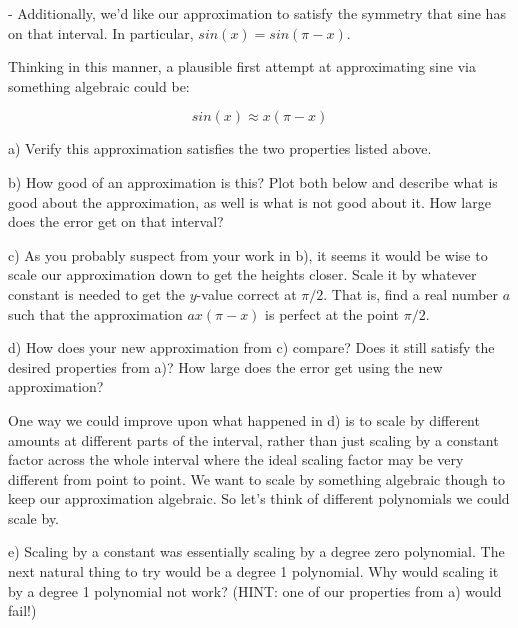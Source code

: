 - Additionally, we'd like our approximation to satisfy the symmetry that sine has on that interval.  In particular, $sin(x)= sin(\pi-x)$.

\vspace{.1in}

Thinking in this manner, a plausible first attempt at approximating sine via something algebraic could be:

$$ sin(x) \approx x(\pi-x)$$

a) Verify this approximation satisfies the two properties listed above.

\vspace{2in}

b) How good of an approximation is this?  Plot both below and describe what is good about the approximation, as well is what is not good about it.   How large does the error get on that interval?

\pagebreak

c) As you probably suspect from your work in b), it seems it would  be wise to scale our approximation down to get the heights closer.  Scale it by whatever constant is needed to get the $y$-value correct at $\pi/2$.  That is, find a real number $a$ such that the approximation $ax(\pi-x)$ is perfect at the point $\pi/2$.

\vspace{2in}

d) How does your new approximation from c) compare?  Does it still satisfy the desired properties from a)?  How large does the error get using the new approximation?

\vspace{3in}

One way we could improve upon what happened in d) is to scale by different amounts at different parts of the interval, rather than just scaling by a constant factor across the whole interval where the ideal scaling factor may be very different from point to point.  We want to scale by something algebraic though to keep our approximation algebraic.  So let's think of different polynomials we could scale by.

\vspace{.1in}

e) Scaling by a constant was essentially scaling by a degree zero polynomial.  The next natural thing to try would be a degree 1 polynomial. Why would scaling it by a degree 1 polynomial not work? (HINT: one of our properties from a) would fail!)

\vspace{2in}

